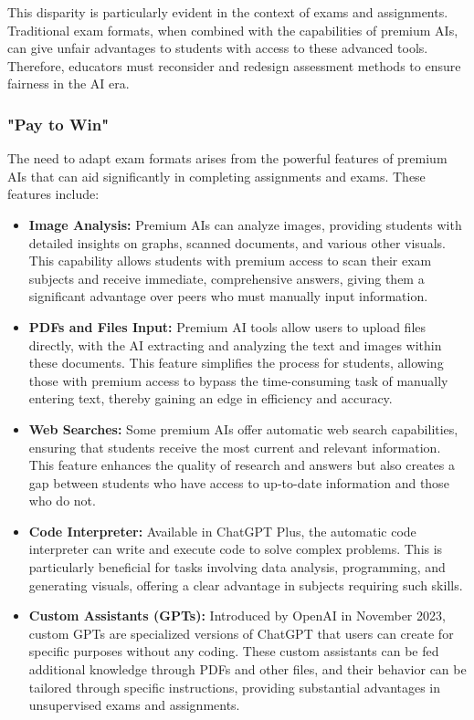 \documentclass{article}
\begin{document}
This disparity is particularly evident in the context of exams and assignments. Traditional exam formats, when combined with the capabilities of premium AIs, can give unfair advantages to students with access to these advanced tools. Therefore, educators must reconsider and redesign assessment methods to ensure fairness in the AI era.

\subsubsection{"Pay to Win"}

The need to adapt exam formats arises from the powerful features of premium AIs that can aid significantly in completing assignments and exams. These features include:

\begin{itemize}
    \item \textbf{Image Analysis:} Premium AIs can analyze images, providing students with detailed insights on graphs, scanned documents, and various other visuals. This capability allows students with premium access to scan their exam subjects and receive immediate, comprehensive answers, giving them a significant advantage over peers who must manually input information.
    \item \textbf{PDFs and Files Input:} Premium AI tools allow users to upload files directly, with the AI extracting and analyzing the text and images within these documents. This feature simplifies the process for students, allowing those with premium access to bypass the time-consuming task of manually entering text, thereby gaining an edge in efficiency and accuracy.
    \item \textbf{Web Searches:} Some premium AIs offer automatic web search capabilities, ensuring that students receive the most current and relevant information. This feature enhances the quality of research and answers but also creates a gap between students who have access to up-to-date information and those who do not.
    \item \textbf{Code Interpreter:} Available in ChatGPT Plus, the automatic code interpreter can write and execute code to solve complex problems. This is particularly beneficial for tasks involving data analysis, programming, and generating visuals, offering a clear advantage in subjects requiring such skills.
    \item \textbf{Custom Assistants (GPTs):} Introduced by OpenAI in November 2023, custom GPTs are specialized versions of ChatGPT that users can create for specific purposes without any coding. These custom assistants can be fed additional knowledge through PDFs and other files, and their behavior can be tailored through specific instructions, providing substantial advantages in unsupervised exams and assignments.
\end{itemize}
\end{document}
